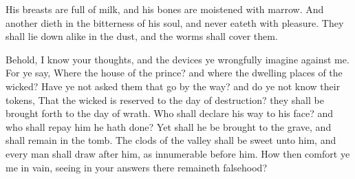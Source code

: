 {His
breasts are
full of
milk, and his
bones are
moistened with
marrow.
And another
dieth in the
bitterness of his
soul, and never
eateth with
pleasure.
They shall lie
down
alike in the
dust, and the
worms shall
cover them.
\par }{\PP {}Behold, I
know your
thoughts, and the
devices
{} ye wrongfully
imagine against me.
For ye
say, Where
{} the
house of the
prince? and where
{} the
dwelling
places of the
wicked?
Have ye not
asked them that
go by the
way? and do ye not
know their
tokens,
That the
wicked is
reserved to the
day of
destruction? they shall be brought
forth to the
day of
wrath.
Who shall
declare his
way to his
face? and who shall
repay him
{} he hath
done?
Yet shall he be
brought to the
grave, and shall
remain in the
tomb.
The
clods of the
valley shall be
sweet unto him, and every
man shall
draw
after him, as
{}
innumerable
before him.
How then
comfort ye me in
vain, seeing in your
answers there
remaineth
falsehood?

}
